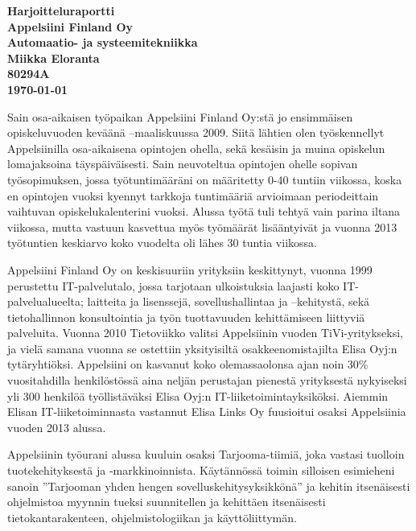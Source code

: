 \documentclass[a4paper,finnish,12pt]{article}
\begin{document}
\thispagestyle{empty}

\begin{titlepage}
    \centering
    \vspace*{11\baselineskip}
    \huge
    \bfseries
    Harjoitteluraportti \\
    \Large
    \vfill
    Appelsiini Finland Oy \\
    \vfill
    \small
    Automaatio- ja systeemitekniikka \\
    \normalfont
    \vfill
    Miikka Eloranta \\
    80294A \\[2\baselineskip]
    \textbf{\today} \\[2\baselineskip]
    \vfill


\end{titlepage}

\pagebreak

Sain osa-aikaisen työpaikan Appelsiini Finland Oy:stä jo ensimmäisen opiskeluvuoden keväänä –maaliskuussa 2009. Siitä lähtien olen työskennellyt Appelsiinilla osa-aikaisena opintojen ohella, sekä kesäisin ja muina opiskelun lomajaksoina täyspäiväisesti.  Sain neuvoteltua opintojen ohelle sopivan työsopimuksen, jossa työtuntimääräni on määritetty 0-40 tuntiin viikossa, koska en opintojen vuoksi kyennyt tarkkoja tuntimääriä arvioimaan periodeittain vaihtuvan opiskelukalenterini vuoksi. Alussa työtä tuli tehtyä vain parina iltana viikossa, mutta vastuun kasvettua myös työmäärät lisääntyivät ja vuonna 2013 työtuntien keskiarvo koko vuodelta oli lähes 30 tuntia viikossa.

Appelsiini Finland Oy on keskisuuriin yrityksiin keskittynyt, vuonna 1999 perustettu IT-palvelutalo, jossa tarjotaan ulkoistuksia laajasti koko IT-palvelualueelta; laitteita ja lisenssejä, sovellushallintaa ja –kehitystä, sekä tietohallinnon konsultointia ja työn tuottavuuden kehittämiseen liittyviä palveluita. Vuonna 2010 Tietoviikko valitsi Appelsiinin vuoden TiVi-yritykseksi, ja vielä samana vuonna se ostettiin yksityisiltä osakkeenomistajilta Elisa Oyj:n tytäryhtiöksi. Appelsiini on kasvanut koko olemassaolonsa ajan noin 30\% vuositahdilla henkilöstössä aina neljän perustajan pienestä yrityksestä nykyiseksi yli 300 henkilöä työllistäväksi Elisa Oyj:n IT-liiketoimintayksiköksi. Aiemmin Elisan IT-liiketoiminnasta vastannut Elisa Links Oy fuusioitui osaksi Appelsiinia vuoden 2013 alussa.

Appelsiinin työurani alussa kuuluin osaksi Tarjooma-tiimiä, joka vastasi tuolloin tuotekehityksestä ja -markkinoinnista. Käytännössä toimin silloisen esimieheni sanoin ”Tarjooman yhden hengen sovelluskehitysyksikkönä” ja kehitin itsenäisesti ohjelmistoa myynnin tueksi suunnitellen ja kehittäen itsenäisesti tietokantarakenteen, ohjelmistologiikan ja käyttöliittymän.
\end{document}

